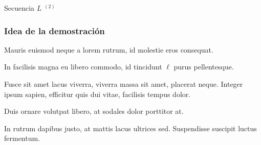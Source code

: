 \documentclass[t, 10pt, mathserif]{beamer}
\begin{document}

\begin{frame}{Secuencia $L$ {$^{(2)}$}}
  \vspace{-0.5cm}
\end{frame}
 

\begin{frame}
  \frametitle{Idea de la demostración}

  Mauris euismod neque a lorem rutrum, id molestie eros consequat.
  \pause
  
  In facilisis magna eu libero commodo, id tincidunt {\color{magenta} $\ell$} purus pellentesque.
  \pause

  \medskip
  \begin{definition}
    Fusce sit amet lacus viverra, viverra massa sit amet, placerat neque. Integer ipsum sapien, efficitur quis dui vitae, facilisis tempus dolor.
    \pause

    Duis ornare volutpat libero, at sodales dolor porttitor at.
    \pause
  \end{definition}

  In rutrum dapibus justo, at mattis lacus ultrices sed. Suspendisse suscipit luctus fermentum.
\end{frame}
\end{document}
